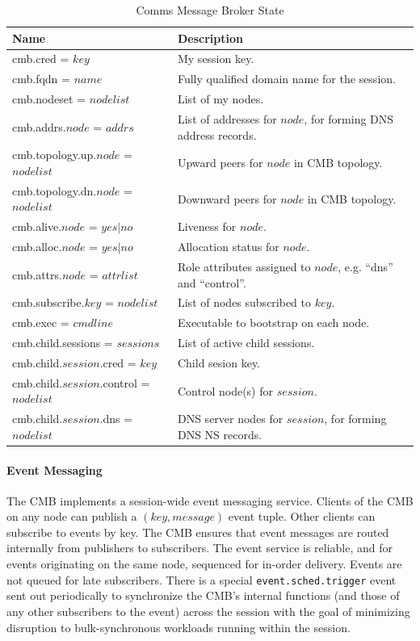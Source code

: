 \begin{table}
  \centering
  \begin{tabular}{| l | p{} |}\hline
  \textbf{Name} & \textbf{Description} \\
  \hline
  cmb.cred = $key$ &
        My session key.\\
  cmb.fqdn = $name$ &
        Fully qualified domain name for the session.\\
  cmb.nodeset = $nodelist$ &
        List of my nodes.\\
  cmb.addrs.$node$ = $addrs$ &
        List of addresses for $node$, for forming DNS address records.\\
  cmb.topology.up.$node$ = $nodelist$ & 
        Upward peers for $node$ in CMB topology.\\
  cmb.topology.dn.$node$ = $nodelist$ &
        Downward peers for $node$ in CMB topology.\\
  cmb.alive.$node$ = $yes|no$ &
        Liveness for $node$.\\
  cmb.alloc.$node$ = $yes|no$ &
        Allocation status for $node$.\\
  cmb.attrs.$node$ = $attrlist$ &
	Role attributes assigned to $node$, e.g. ``dns'' and ``control''.\\
  cmb.subscribe.$key$ = $nodelist$ &
        List of nodes subscribed to $key$.\\
  cmb.exec = $cmdline$ &
        Executable to bootstrap on each node.\\
  \hline
  cmb.child.sessions = $sessions$ &
        List of active child sessions.\\
  cmb.child.$session$.cred = $key$ &
        Child sesion key.\\
  cmb.child.$session$.control = $nodelist$ &
        Control node(s) for $session$.\\
  cmb.child.$session$.dns = $nodelist$ &
        DNS server nodes for $session$, for forming DNS NS records.\\
  \hline
  \end{tabular}
  \caption{Comms Message Broker State}
  \label{TabCMBState}
\end{table}

\paragraph{Event Messaging}
The CMB implements a session-wide event messaging service.
Clients of the CMB on any node can publish a $(key, message)$ event tuple.
Other clients can subscribe to events by key.  The CMB ensures that
event messages are routed internally from publishers to subscribers.
The event service is reliable, and for events originating on the same node,
sequenced for in-order delivery.
Events are not queued for late subscribers.
There is a special {\tt event.sched.trigger} event sent out periodically
to synchronize the CMB's internal functions (and those of any other
subscribers to the event) across the session with the goal of minimizing
disruption to bulk-synchronous workloads running within the session.

